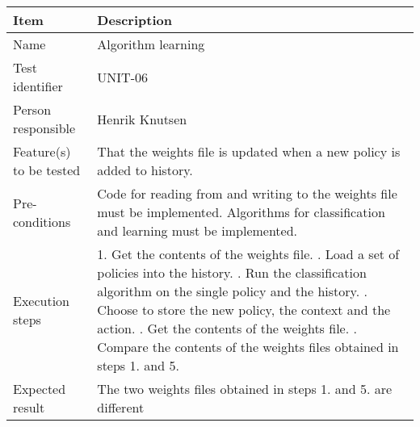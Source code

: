		\begin{center}
			\begin{tabular}{ |  p{3.5cm} | p{10cm} | }
				\hline
				Item & Description \\ [5pt] \hline \hline
				Name & Algorithm learning \\  [5pt] \hline
				Test identifier & UNIT-06 \\  [5pt] \hline
				Person responsible & Henrik Knutsen \\  [5pt] \hline
				Feature(s) to be tested & That the weights file is updated when a new policy is added to history. \\  [5pt] \hline
				Pre-conditions & Code for reading from and writing to the weights file must be implemented. Algorithms for classification and learning must be implemented. \\  [5pt] \hline
				Execution steps & 1. Get the contents of the weights file. \newline 2. Load a set of policies into the history. \newline 3. Run the classification algorithm on the single policy and the history. \newline 4. Choose to store the new policy, the context and the action.
					\newline 5. Get the contents of the weights file. \newline 6. Compare the contents of the weights files obtained in steps 1. and 5. \\  [5pt] \hline
				Expected result & The two weights files obtained in steps 1. and 5. are different \\  [5pt] \hline
			\end{tabular}
		\end{center}

